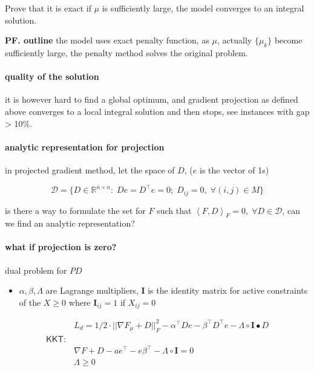 \documentclass[
  10pt,
  a4paper,
,tablecaptionabove
]{scrartcl}
\providecommand{\tightlist}{%
  \setlength{\itemsep}{0pt}\setlength{\parskip}{0pt}}
\begin{document}
Prove that it is exact if \(\mu\) is sufficiently large, the model
converges to an integral solution.

\textbf{PF. outline} the model uses exact penalty function, as \(\mu\),
actually \(\{\mu_k\}\) become sufficiently large, the penalty method
solves the original problem.

\hypertarget{quality-of-the-solution}{%
\paragraph{quality of the solution}\label{quality-of-the-solution}}

it is however hard to find a global optimum, and gradient projection as
defined above converges to a local integral solution and then stops, see
instances with gap \textgreater{} 10\%.

\hypertarget{analytic-representation-for-projection}{%
\paragraph{analytic representation for
projection}\label{analytic-representation-for-projection}}

in projected gradient method, let the space of \(D\), (\(e\) is the
vector of 1s)

\[\mathcal D = \{D\in\mathbb{R}^{n\times n} : \; D e = D^\top e = 0;\; D_{ij} = 0,\;\forall  (i,j) \in M \}\]

is there a way to formulate the set for \(F\) such that
\(\left <F, D \right>_F = 0, \; \forall D\in \mathcal D\), can we find
an analytic representation?

\hypertarget{what-if-projection-is-zero}{%
\paragraph{what if projection is
zero?}\label{what-if-projection-is-zero}}

dual problem for \(PD\)

\begin{itemize}
\tightlist
\item
  \(\alpha,\beta,\Lambda\) are Lagrange multipliers, \(\mathbf I\) is
  the identity matrix for active constraints of the \(X \ge 0\) where
  \(\mathbf I_{ij} = 1\) if \(X_{ij} = 0\)
\end{itemize}

\[\begin{aligned}
& L_d = 1/2\cdot ||\nabla F_\mu + D ||_F^2 - \alpha^\top De - \beta^\top D^\top e -\Lambda \circ \mathbf I \bullet D\\
\mathsf{KKT:} & \\
& \nabla F+D - ae^\top - e\beta^\top -\Lambda \circ \mathbf{I} = 0 \\
& \Lambda \ge 0
\end{aligned}\]
\end{document}
